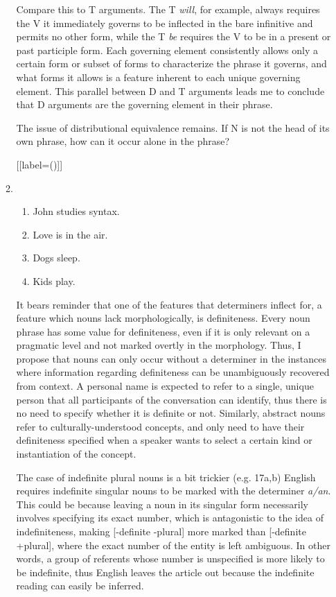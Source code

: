 \documentclass[12pt]{article}
\begin{document}
\begin{enumerate}[label=\textbf{\arabic*.}]
\begin{enumerate}[label=(\arabic*)]
Compare this to T arguments. The T \emph{will}, for example, always requires the V it immediately governs to be inflected in the bare infinitive and permits no other form, while the T \emph{be} requires the V to be in a present or past participle form. Each governing element consistently allows only a certain form or subset of forms to characterize the phrase it governs, and what forms it allows is a feature inherent to each unique governing element. This parallel between D and T arguments leads me to conclude that D arguments are the governing element in their phrase.

The issue of distributional equivalence remains. If N is not the head of its own phrase, how can it occur alone in the phrase?

[{[label=(\arabic*)]}]
\item
\begin{enumerate}[label=\alph*.]
\item John studies syntax.
\item Love is in the air.
\item Dogs sleep.
\item Kids play.
\end{enumerate}

It bears reminder that one of the features that determiners inflect for, a feature which nouns lack morphologically, is definiteness. Every noun phrase has some value for definiteness, even if it is only relevant on a pragmatic level and not marked overtly in the morphology. Thus, I propose that nouns can only occur without a determiner in the instances where information regarding definiteness can be unambiguously recovered from context. A personal name is expected to refer to a single, unique person that all participants of the conversation can identify, thus there is no need to specify whether it is definite or not. Similarly, abstract nouns refer to culturally-understood concepts, and only need to have their definiteness specified when a speaker wants to select a certain kind or instantiation of the concept.

The case of indefinite plural nouns is a bit trickier (e.g. 17a,b)  English requires indefinite singular nouns to be marked with the determiner \emph{a/an}. This could be because leaving a noun in its singular form necessarily involves specifying its exact number, which is antagonistic to the idea of indefiniteness, making [-definite -plural] more marked than [-definite +plural], where the exact number of the entity is left ambiguous. In other words, a group of referents whose number is unspecified is more likely to be indefinite, thus English leaves the article out because the indefinite reading can easily be inferred.


\end{enumerate}
\end{enumerate}
\end{document}

